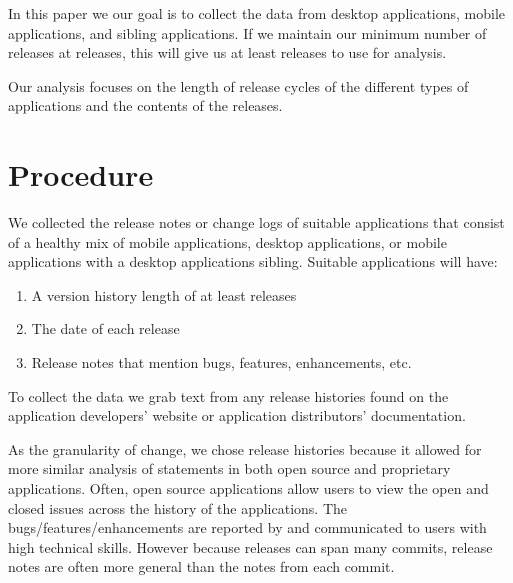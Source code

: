 \documentclass{acm_proc_article-sp}
\begin{document}
In this paper we our goal is to collect the data from \NumDesktopApps desktop applications, \NumMobileApps mobile applications, and \NumSiblingpApps sibling applications. 
If we maintain our minimum number of releases at \MinNumReleases releases, this will give us at least \TotalNumReleases releases to use for analysis.

Our analysis focuses on the length of release cycles of the different types of applications and the contents of the releases.



\section{Procedure}
We collected the release notes or change logs of suitable applications that consist of a healthy mix of mobile applications, desktop applications, or  mobile applications with a desktop applications sibling. 
Suitable applications will have:

\begin{enumerate}
	\item A version history length of at least \MinNumReleases releases
	\item The date of each release
	\item Release notes that mention bugs, features, enhancements, etc.
\end{enumerate}

To collect the data we grab text from any release histories found on the application developers' website or application distributors' documentation. 

As the granularity of change, we chose release histories because it allowed for more similar analysis of statements in both open source and proprietary applications. 
Often, open source applications allow users to view the open and closed issues across the history of the applications. 
The bugs/features/enhancements are reported by and communicated to users with high technical skills. 
However because releases can span many commits, release notes are often more general than the notes from each commit.
\end{document}
